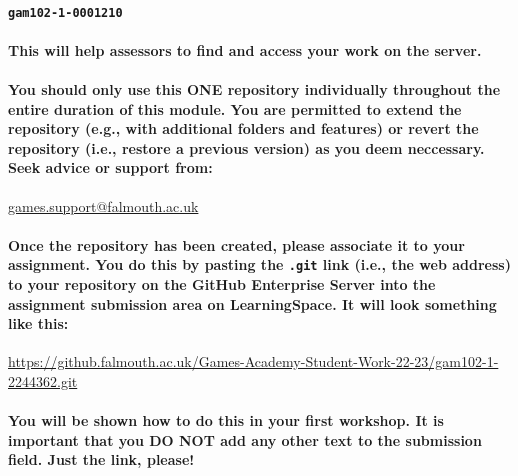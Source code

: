 \documentclass{../../fal_assignment}
\begin{document}
\paragraph{\texttt{gam102-1-0001210}} 
 
\paragraph{This will help assessors to find and access your work on the server.}


\paragraph{You should only use this \textbf{ONE} repository individually throughout the entire duration of this module. You are permitted to extend the repository (e.g., with additional folders and features) or revert the repository (i.e., restore a previous version) as you deem neccessary. Seek advice or support from:}

\url{games.support@falmouth.ac.uk}

\paragraph{Once the repository has been created, please associate it to your assignment. You do this by pasting the \texttt{.git} link (i.e., the web address) to your repository on the GitHub Enterprise Server into the assignment submission area on LearningSpace. It will look something like this:}

{\footnotesize\url{https://github.falmouth.ac.uk/Games-Academy-Student-Work-22-23/gam102-1-2244362.git}}

\paragraph{You will be shown how to do this in your first workshop. It is important that you \textbf{DO NOT} add any other text to the submission field. Just the link, please!}

\end{document}
